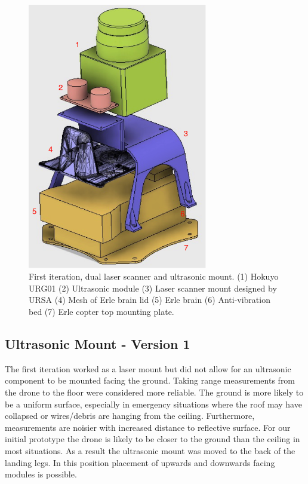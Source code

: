 \documentclass[capstone_report.tex]{subfiles}
\begin{document}
\begin{figure}[H]
    \centering
    \includegraphics[width=0.7\textwidth]{imgs/mount1_labelled.png}
    \caption{First iteration, dual laser scanner and ultrasonic mount. (1) Hokuyo URG01 (2) Ultrasonic module (3) Laser scanner mount designed by URSA (4) Mesh of Erle brain lid (5) Erle brain (6) Anti-vibration bed (7) Erle copter top mounting plate.\label{fig:mount1}}
\end{figure}

\subsection{Ultrasonic Mount - Version 1}

The first iteration worked as a laser mount but did not allow for an ultrasonic component to be mounted facing the ground.  Taking range measurements from the drone to the floor were considered more reliable.  The ground is more likely to be a uniform surface, especially in emergency situations where the roof may have collapsed or wires/debris are hanging from the ceiling.  Furthermore, measurements are noisier with increased distance to reflective surface.  For our initial prototype the drone is likely to be closer to the ground than the ceiling in most situations.  As a result the ultrasonic mount was moved to the back of the landing legs.  In this position placement of upwards and downwards facing modules is possible.
\end{document}
